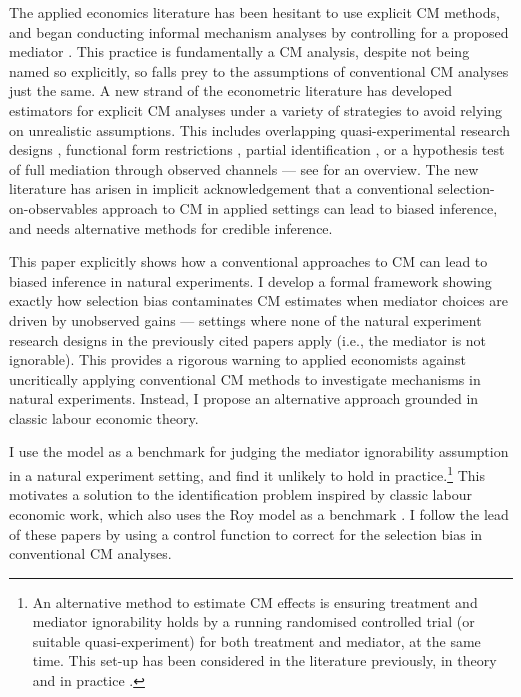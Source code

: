 The applied economics literature has been hesitant to use explicit CM methods, and began conducting informal mechanism analyses by controlling for a proposed mediator \citep{blackwell2024assumption}.
This practice is fundamentally a CM analysis, despite not being named so explicitly, so falls prey to the assumptions of conventional CM analyses just the same.
A new strand of the econometric literature has developed estimators for explicit CM analyses under a variety of strategies to avoid relying on unrealistic assumptions.
This includes overlapping quasi-experimental research designs \citep{deuchert2019direct,frolich2017direct}, functional form restrictions \citep{heckman2015econometric}, partial identification \citep{flores2009identification}, or a hypothesis test of full mediation through observed channels \citep{kwon2024testing} --- see \cite{huber2019review} for an overview.
The new literature has arisen in implicit acknowledgement that a conventional selection-on-observables approach to CM in applied settings can lead to biased inference, and needs alternative methods for credible inference.

This paper explicitly shows how a conventional approaches to CM can lead to biased inference in natural experiments.
I develop a formal framework showing exactly how selection bias contaminates CM estimates when mediator choices are driven by unobserved gains --- settings where none of the natural experiment research designs in the previously cited papers apply (i.e., the mediator is not ignorable).
This provides a rigorous warning to applied economists against uncritically applying conventional CM methods to investigate mechanisms in natural experiments.
Instead, I propose an alternative approach grounded in classic labour economic theory.

I use the \cite{roy1951some} model as a benchmark for judging the \cite{imai2010identification} mediator ignorability assumption in a natural experiment setting, and find it unlikely to hold in practice.\footnote{
    An alternative method to estimate CM effects is ensuring treatment and mediator ignorability holds by a running randomised controlled trial (or suitable quasi-experiment) for both treatment and mediator, at the same time.
    This set-up has been considered in the literature previously, in theory \citep{imai2013experimental,heckman2015econometric} and in practice \citep{ludwig2011mechanism,heckman2013understanding}.
}
This motivates a solution to the identification problem inspired by classic labour economic work, which also uses the Roy model as a benchmark \citep{heckman1979sample,heckman1990empirical}.
I follow the lead of these papers by using a control function to correct for the selection bias in conventional CM analyses.

